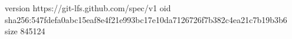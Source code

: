 version https://git-lfs.github.com/spec/v1
oid sha256:547fdefa0abc15eaf8e4f21e993bc17e10da7126726f7b382c4ea21c7b19b3b6
size 845124
